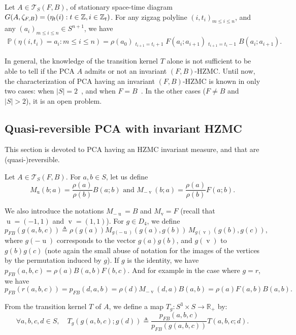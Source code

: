 \documentclass[10pt]{amsart}
\theoremstyle{definition}\newtheorem{defi}[theo]{Definition}\newtheorem{rema}[theo]{Remark}\newtheorem{exam}[theo]{Example}\newtheorem{exem}[theo]{Example}\newtheorem{nota}[theo]{Notation}
\newcounter{a}
\newcommand{\triang}[2]{\mathcal{T}_{#1} \left(#2 \right)}
\newcommand{\ZZ}{\mathbb{Z}}
\newcommand{\Pbb}{\mathbb{P}}
\DeclareMathOperator{\vu}{u}
\DeclareMathOperator{\vv}{v}
\newcommand{\Fh}{M_{-\vv}}
\newcommand{\Bh}{M_{\vu}}
\newcommand{\isdef}{\triangleq}
\let\oldforall\forall
\renewcommand*{\forall}{\mathrel{\oldforall}}
\begin{document}
\begin{prop}\label{prop:ind_m}
Let $A\in\triang{S}{F,B}$, of stationary space-time diagram $G(A,\linebreak\zeta_{F,B})=(\eta_t(i) : t \in \ZZ, i \in \ZZ_t)$. For any zigzag polyline $(i,t_i)_{m\leq i\leq n}$, and any $(a_i)_{m \leq i \leq n}\in S^{n+1}$, we have
\begin{align*}
\Pbb\left(\eta(i,t_i) = a_i : m \leq i \leq n\right) = \rho(a_0) \mathop{\prod_{m\in\{0,\ldots,n-1\}}}_{t_{i+1}=t_i+1} F(a_i;a_{i+1}) \mathop{\prod_{m\in\{0,\ldots,n-1\}}}_{t_{i+1}=t_i-1} B(a_i;a_{i+1}).
\end{align*}
\end{prop}

In general, the knowledge of the transition kernel $T$ alone is not sufficient to be able to tell if the PCA $A$ admits or not an invariant $(F,B)$-HZMC. Until now, the characterization of PCA having an invariant $(F,B)$-HZMC is known in only two cases: when $|S|=2$~\cite[Theorem~5.3]{Casse17}, and when $F=B$~\cite[Theorem~5.2]{Casse17}. In the other cases ($F \neq B$ and $|S|>2$), it is an open problem.

\subsection{Quasi-reversible PCA with invariant HZMC}

This section is devoted to PCA having an HZMC invariant measure, and that are (quasi-)reversible.

Let $A\in \triang{S}{F,B}$. For $a,b\in S$, let us define
\[
\Bh (b;a) = \frac{\rho(a)}{\rho(b)} B(a;b) \text{ and } \Fh (b;a) = \frac{\rho(a)}{\rho(b)} F(a;b).
\]

We also introduce the notations $M_{-\vu}=B$ and $M_{\vv}=F$ (recall that $\vu=(-1,1)$ and $\vv=(1,1)$). For $g\in D_4$, we define
\[
p_{FB}(g(a,b,c))\isdef \rho(g(a))M_{g(-\vu)}(g(a),g(b))\,M_{g(\vv)}(g(b),g(c)),
\]
where $g(-\vu)$ corresponds to the vector $g(a)g(b)$, and $g(\vv)$ to $g(b)g(c)$ (note again the small abuse of notation for the images of the vertices by the permutation induced by $g$). If $g$ is the identity, we have $p_{FB}(a,b,c)=\rho(a)B(a,b)F(b,c).$ And for example in the case where $g=r$, we have
\[
p_{FB}(r(a,b,c))=p_{FB}(d,a,b)=\rho(d)M_{-\vv}(d,a)B(a,b)=\rho(a)F(a,b)B(a,b).
\]

From the transition kernel $T$ of $A$, we define a map $T_g: S^3 \times S\to \mathbb R_+$ by:
\[
\forall a,b,c,d\in S, \quad T_g(g(a,b,c);g(d))\isdef\frac{p_{FB}(a,b,c)}{p_{FB}(g(a,b,c))}T(a,b,c;d).
\]
\end{document}
